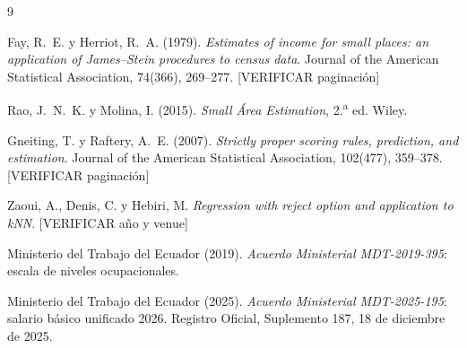 \documentclass[12pt,a4paper]{report}
\begin{document}
\begin{thebibliography}{9}

Fay, R.~E. y Herriot, R.~A. (1979).
\emph{Estimates of income for small places: an application of James--Stein
procedures to census data}.
Journal of the American Statistical Association, 74(366), 269--277.
\hfill [VERIFICAR paginación]

Rao, J.~N.~K. y Molina, I. (2015).
\emph{Small Área Estimation}, 2.\textsuperscript{a} ed.
Wiley.

Gneiting, T. y Raftery, A.~E. (2007).
\emph{Strictly proper scoring rules, prediction, and estimation}.
Journal of the American Statistical Association, 102(477), 359--378.
\hfill [VERIFICAR paginación]

Zaoui, A., Denis, C. y Hebiri, M.
\emph{Regression with reject option and application to kNN}.
\hfill [VERIFICAR año y venue]

Ministerio del Trabajo del Ecuador (2019).
\emph{Acuerdo Ministerial MDT-2019-395}: escala de niveles ocupacionales.

Ministerio del Trabajo del Ecuador (2025).
\emph{Acuerdo Ministerial MDT-2025-195}: salario básico unificado 2026.
Registro Oficial, Suplemento 187, 18 de diciembre de 2025.

\end{thebibliography}
\end{document}
